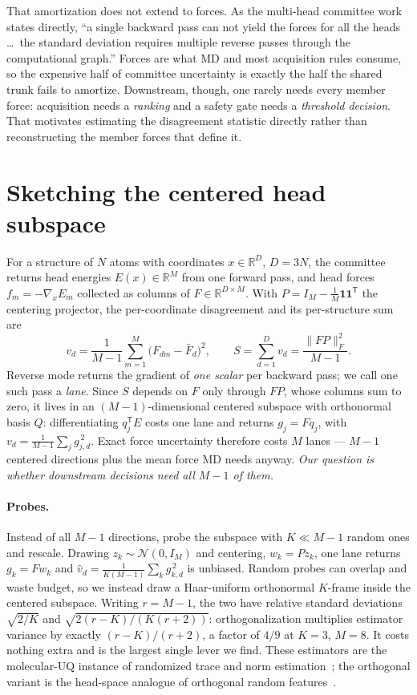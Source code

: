 \documentclass{article}
\begin{document}
That amortization does not extend to forces. As the multi-head committee work states directly, ``a
single backward pass can not yield the forces for all the heads \ldots\ the standard deviation
requires multiple reverse passes through the computational graph.'' Forces are what MD and most
acquisition rules consume, so the expensive half of committee uncertainty is exactly the half the
shared trunk fails to amortize. Downstream, though, one rarely needs every member force: acquisition
needs a \emph{ranking} and a safety gate needs a \emph{threshold decision}. That motivates estimating
the disagreement statistic directly rather than reconstructing the member forces that define it.

\section{Sketching the centered head subspace}
\label{sec:method}
For a structure of $N$ atoms with coordinates $x\in\mathbb{R}^{D}$, $D=3N$, the committee returns
head energies $E(x)\in\mathbb{R}^{M}$ from one forward pass, and head forces
$f_m=-\nabla_x E_m$ collected as columns of $F\in\mathbb{R}^{D\times M}$. With
$P=I_M-\tfrac1M\mathbf 1\mathbf 1^{\mathsf T}$ the centering projector, the per-coordinate
disagreement and its per-structure sum are
\begin{equation}
v_d=\frac{1}{M-1}\sum_{m=1}^{M}\bigl(F_{dm}-\bar F_d\bigr)^2 ,
\qquad
S=\sum_{d=1}^{D} v_d=\frac{\lVert FP\rVert_F^2}{M-1} .
\end{equation}
Reverse mode returns the gradient of \emph{one scalar} per backward pass; we call one such pass a
\emph{lane}. Since $S$ depends on $F$ only through $FP$, whose columns sum to zero, it lives in an
$(M{-}1)$-dimensional centered subspace with orthonormal basis $Q$: differentiating $q_j^{\mathsf T}E$
costs one lane and returns $g_j=Fq_j$, with $v_d=\frac{1}{M-1}\sum_j g_{j,d}^{\,2}$. Exact force
uncertainty therefore costs $M$ lanes --- $M{-}1$ centered directions plus the mean force MD needs
anyway. \emph{Our question is whether downstream decisions need all $M{-}1$ of them.}

\paragraph{Probes.} Instead of all $M{-}1$ directions, probe the subspace with $K\ll M{-}1$ random
ones and rescale. Drawing $z_k\sim\mathcal N(0,I_M)$ and centering, $w_k=Pz_k$, one lane returns
$g_k=Fw_k$ and $\widehat v_d=\frac{1}{K(M-1)}\sum_k g_{k,d}^{\,2}$ is unbiased. Random probes can
overlap and waste budget, so we instead draw a Haar-uniform orthonormal $K$-frame inside the centered
subspace. Writing $r=M{-}1$, the two have relative standard deviations $\sqrt{2/K}$ and
$\sqrt{2(r-K)/(K(r+2))}$: orthogonalization multiplies estimator variance by exactly $(r-K)/(r+2)$,
a factor of $4/9$ at $K{=}3$, $M{=}8$. It costs nothing extra and is the largest single lever we
find. These estimators are the molecular-UQ instance of randomized trace and norm
estimation~\citep{hutchinson,avron2011,hutchpp}; the orthogonal variant is the head-space analogue of
orthogonal random features~\citep{yu2016orf}.
\end{document}
